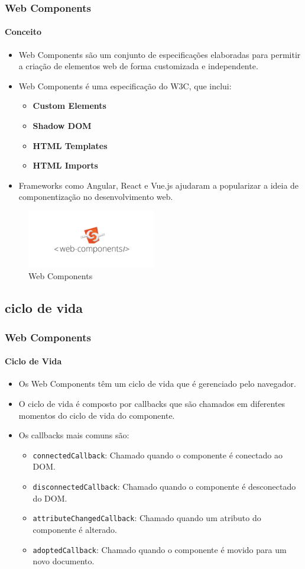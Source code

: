 \documentclass[
	9pt, %
	t, %
]{beamer}
\begin{document}
\begin{frame}
	\frametitle{Web Components}
	\framesubtitle{Conceito}
	\begin{itemize}
		\item Web Components são um conjunto de especificações elaboradas para permitir a criação de elementos web de forma customizada e independente.
		\item Web Components é uma especificação do W3C, que inclui:
		\begin{itemize}
			\item \textbf{Custom Elements}
			\item \textbf{Shadow DOM}
			\item \textbf{HTML Templates}
			\item \textbf{HTML Imports}
		\end{itemize}
		\item Frameworks como Angular, React e Vue.js ajudaram a popularizar a ideia de componentização no desenvolvimento web.
	\end{itemize}

	\begin{figure}
		\centering
		\includegraphics[width=0.5\textwidth]{web_components.jpg}
		\caption{Web Components}
	\end{figure}

\end{frame}

\subsection{ciclo de vida}

\begin{frame}
	\frametitle{Web Components}
	\framesubtitle{Ciclo de Vida}
	\begin{itemize}
		\item Os Web Components têm um ciclo de vida que é gerenciado pelo navegador.
		\item O ciclo de vida é composto por callbacks que são chamados em diferentes momentos do ciclo de vida do componente.
		\item Os callbacks mais comuns são:
		\begin{itemize}
			\item \texttt{connectedCallback}: Chamado quando o componente é conectado ao DOM.
			\item \texttt{disconnectedCallback}: Chamado quando o componente é desconectado do DOM.
			\item \texttt{attributeChangedCallback}: Chamado quando um atributo do componente é alterado.
			\item \texttt{adoptedCallback}: Chamado quando o componente é movido para um novo documento.
		\end{itemize}
	\end{itemize}

\end{frame}
\end{document}
